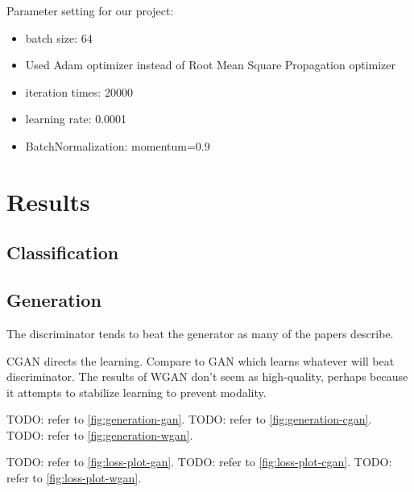 \documentclass[conference]{IEEEtran}
\begin{document}
    Parameter setting for our project:

    \begin{itemize}
        \item batch size: 64
        \item Used Adam optimizer instead of Root Mean Square Propagation optimizer
        \item iteration times: 20000
        \item learning rate: 0.0001
        \item BatchNormalization: momentum=0.9
    \end{itemize}

    \section{Results}\label{sec:results}

    \subsection{Classification}\label{subsec:results-classification}

    \subsection{Generation}\label{subsec:results-generation}

    The discriminator tends to beat the generator as many of the papers describe.

    CGAN directs the learning. Compare to GAN which learns whatever will beat discriminator. The results of WGAN don't seem as high-quality, perhaps because it attempts to stabilize learning to prevent modality.

    TODO: refer to \autoref{fig:generation-gan}.
    TODO: refer to \autoref{fig:generation-cgan}.
    TODO: refer to \autoref{fig:generation-wgan}.

    TODO: refer to \autoref{fig:loss-plot-gan}.
    TODO: refer to \autoref{fig:loss-plot-cgan}.
    TODO: refer to \autoref{fig:loss-plot-wgan}.
\end{document}
